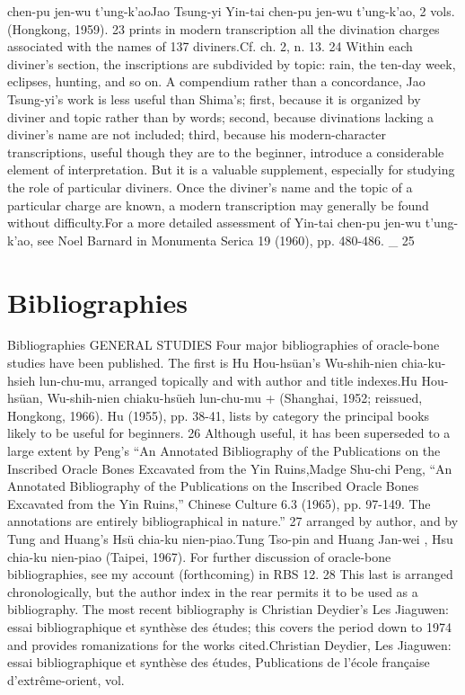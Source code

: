 chen-pu jen-wu t'ung-k'aoJao Tsung-yi Yin-tai chen-pu jen-wu t'ung-k'ao, 2 vols. (Hongkong, 1959). 23 prints in modern transcription all the divination charges associated
with the names of 137 diviners.Cf. ch. 2, n. 13. 24 Within each diviner's section, the inscriptions are subdivided by topic: rain, the ten-day week, eclipses, hunting, and so on. A compendium
rather than a concordance, Jao Tsung-yi's work is less useful than Shima's; first, because
it is organized by diviner and topic rather than by words; second, because divinations
lacking a diviner's name are not included; third, because his modern-character transcriptions, useful though they are to the beginner, introduce a considerable element of interpretation. But it is a valuable supplement, especially for studying the role of particular
diviners. Once the diviner's name and the topic of a particular charge are known, a modern
transcription may generally be found without difficulty.For a more detailed assessment of Yin-tai chen-pu jen-wu t'ung-k'ao, see Noel Barnard in Monumenta Serica 19 (1960), pp. 480-486. _ 25

\section[Bibliographies]{Bibliographies}
\label{sec:chapters-ch03:3.4}

Bibliographies
GENERAL STUDIES
Four major bibliographies of oracle-bone studies have been published. The first
is Hu Hou-hsüan's Wu-shih-nien chia-ku-hsieh lun-chu-mu, arranged topically and with
author and title indexes.Hu Hou-hsüan, Wu-shih-nien chiaku-hsüeh lun-chu-mu + (Shanghai, 1952; reissued, Hongkong, 1966). Hu (1955), pp. 38-41, lists by category the principal books likely to be useful for beginners. 26 Although useful, it has been superseded to a large extent by
Peng's ``An Annotated Bibliography of the Publications on the Inscribed Oracle Bones
Excavated from the Yin Ruins,Madge Shu-chi Peng, ``An Annotated Bibliography of the Publications on the Inscribed Oracle Bones Excavated from the Yin Ruins,'' Chinese Culture 6.3 (1965), pp. 97-149. The annotations are entirely bibliographical in nature.'' 27 arranged by author, and by Tung and Huang's Hsü
chia-ku nien-piao.Tung Tso-pin and Huang Jan-wei , Hsu chia-ku nien-piao (Taipei, 1967). For further discussion of oracle-bone bibliographies, see my account (forthcoming) in RBS 12. 28 This last is arranged chronologically, but the author index in the rear
permits it to be used as a bibliography. The most recent bibliography is Christian Deydier's
Les Jiaguwen: essai bibliographique et synthèse des études; this covers the period down to 1974
and provides romanizations for the works cited.Christian Deydier, Les Jiaguwen: essai bibliographique et synthèse des études, Publications de l'école française d'extrême-orient, vol.

